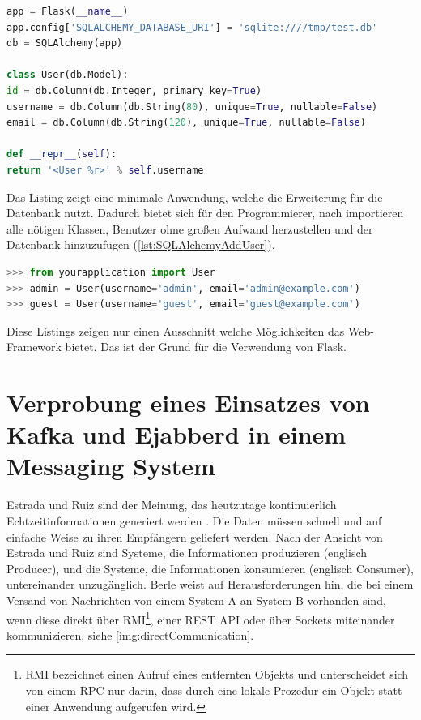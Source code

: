 \documentclass[a4paper,titlepage,halfparskip,12pt]{scrreprt}
\begin{document}
\begin{onehalfspacing}
\begin{lstlisting}[language=Python,caption=Example Listing of Flask-SQLAlchemy,label={lst:SQLAlchemyMinApp}]
app = Flask(__name__)
app.config['SQLALCHEMY_DATABASE_URI'] = 'sqlite:////tmp/test.db'
db = SQLAlchemy(app)

class User(db.Model):
id = db.Column(db.Integer, primary_key=True)
username = db.Column(db.String(80), unique=True, nullable=False)
email = db.Column(db.String(120), unique=True, nullable=False)

def __repr__(self):
return '<User %r>' % self.username
\end{lstlisting}
Das Listing zeigt eine minimale Anwendung, welche die Erweiterung für die Datenbank nutzt. Dadurch bietet sich für den Programmierer, nach importieren alle nötigen Klassen, Benutzer ohne großen Aufwand herzustellen und der Datenbank hinzuzufügen (\autoref{lst:SQLAlchemyAddUser}).
\begin{lstlisting}[language=Python,caption=Hinzufügen eines Objektes in die Datenbanktabelle,label={lst:SQLAlchemyAddUser}]
>>> from yourapplication import User
>>> admin = User(username='admin', email='admin@example.com')
>>> guest = User(username='guest', email='guest@example.com')
\end{lstlisting}
Diese Listings zeigen nur einen Ausschnitt welche Möglichkeiten das Web-Framework bietet. Das ist der Grund für die Verwendung von Flask.\cite{FlaskDoc}
\pagebreak

\chapter{Verprobung eines Einsatzes von Kafka und Ejabberd in einem Messaging System}
\label{chap:VerprbungIMS}

Estrada und Ruiz sind der Meinung, das heutzutage kontinuierlich Echtzeitinformationen generiert werden \cite{estradaRuiz2016}. Die Daten müssen schnell und auf einfache Weise zu ihren Empfängern geliefert werden. Nach der Ansicht von Estrada und Ruiz \cite{estradaRuiz2016} sind Systeme, die Informationen produzieren (englisch Producer), und die Systeme, die Informationen konsumieren (englisch Consumer), untereinander unzugänglich. Berle \cite{berleKafkaOverview} weist auf Herausforderungen hin, die bei einem Versand von Nachrichten von einem System A an System B vorhanden sind, wenn diese direkt über \acs{RMI}\footnote{\ac{RMI} bezeichnet einen Aufruf eines entfernten Objekts und unterscheidet sich von einem \ac{RPC} nur darin, dass durch eine lokale Prozedur ein Objekt statt einer Anwendung aufgerufen wird.\cite[S.41]{andrew2008verteilte}}, einer \acs{REST} \acs{API} oder über Sockets miteinander kommunizieren, siehe \autoref{img:directCommunication}.


\end{onehalfspacing}
\end{document}
